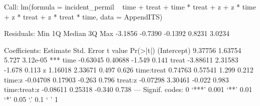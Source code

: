 Call:
lm(formula = incident_permil ~ time + treat + time * treat + 
    z + z * time + z * treat + z * treat * time, data = AppendITS)

Residuals:
    Min      1Q  Median      3Q     Max 
-3.1856 -0.7390 -0.1392  0.8231  3.0234 

Coefficients:
             Estimate Std. Error t value Pr(>|t|)    
(Intercept)   9.37756    1.63754   5.727 3.12e-05 ***
time         -0.63045    0.40688  -1.549    0.141    
treat        -3.88611    2.31583  -1.678    0.113    
z             1.16018    2.33671   0.497    0.626    
time:treat    0.74763    0.57541   1.299    0.212    
time:z       -0.04708    0.17903  -0.263    0.796    
treat:z      -0.07298    3.30461  -0.022    0.983    
time:treat:z -0.08611    0.25318  -0.340    0.738    
---
Signif. codes:  0 ‘***’ 0.001 ‘**’ 0.01 ‘*’ 0.05 ‘.’ 0.1 ‘ ’ 1